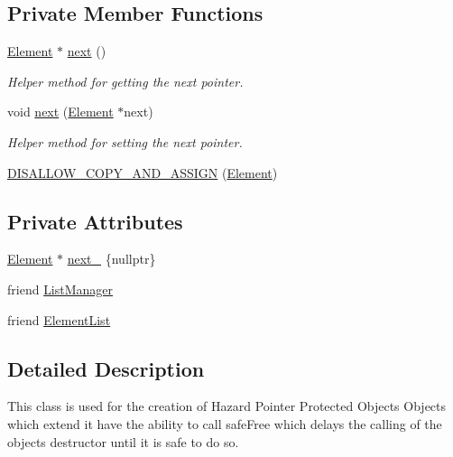 \subsection*{Private Member Functions}
\begin{DoxyCompactItemize}
\item 
\hyperlink{classtervel_1_1util_1_1memory_1_1hp_1_1_element}{Element} $\ast$ \hyperlink{classtervel_1_1util_1_1memory_1_1hp_1_1_element_ac7b4a852a630298613bad1c57fb58d7f}{next} ()
\begin{DoxyCompactList}\small\item\em Helper method for getting the next pointer. \end{DoxyCompactList}\item 
void \hyperlink{classtervel_1_1util_1_1memory_1_1hp_1_1_element_a0611147a7c56ce225ec3129c2770eb9e}{next} (\hyperlink{classtervel_1_1util_1_1memory_1_1hp_1_1_element}{Element} $\ast$next)
\begin{DoxyCompactList}\small\item\em Helper method for setting the next pointer. \end{DoxyCompactList}\item 
\hyperlink{classtervel_1_1util_1_1memory_1_1hp_1_1_element_ad02ba6ec20e44c7a7e3cf8f9cea8e759}{D\+I\+S\+A\+L\+L\+O\+W\+\_\+\+C\+O\+P\+Y\+\_\+\+A\+N\+D\+\_\+\+A\+S\+S\+I\+G\+N} (\hyperlink{classtervel_1_1util_1_1memory_1_1hp_1_1_element}{Element})
\end{DoxyCompactItemize}
\subsection*{Private Attributes}
\begin{DoxyCompactItemize}
\item 
\hyperlink{classtervel_1_1util_1_1memory_1_1hp_1_1_element}{Element} $\ast$ \hyperlink{classtervel_1_1util_1_1memory_1_1hp_1_1_element_a6a0fa344b7f35ea4db2381a54dfd6c8d}{next\+\_\+} \{nullptr\}
\item 
friend \hyperlink{classtervel_1_1util_1_1memory_1_1hp_1_1_element_a2bede6af4da0ddbd5d5e12861432d670}{List\+Manager}
\item 
friend \hyperlink{classtervel_1_1util_1_1memory_1_1hp_1_1_element_abf4d1f696e870e12271bffb158ceb7c7}{Element\+List}
\end{DoxyCompactItemize}


\subsection{Detailed Description}
This class is used for the creation of Hazard Pointer Protected Objects Objects which extend it have the ability to call safe\+Free which delays the calling of the objects destructor until it is safe to do so. 

